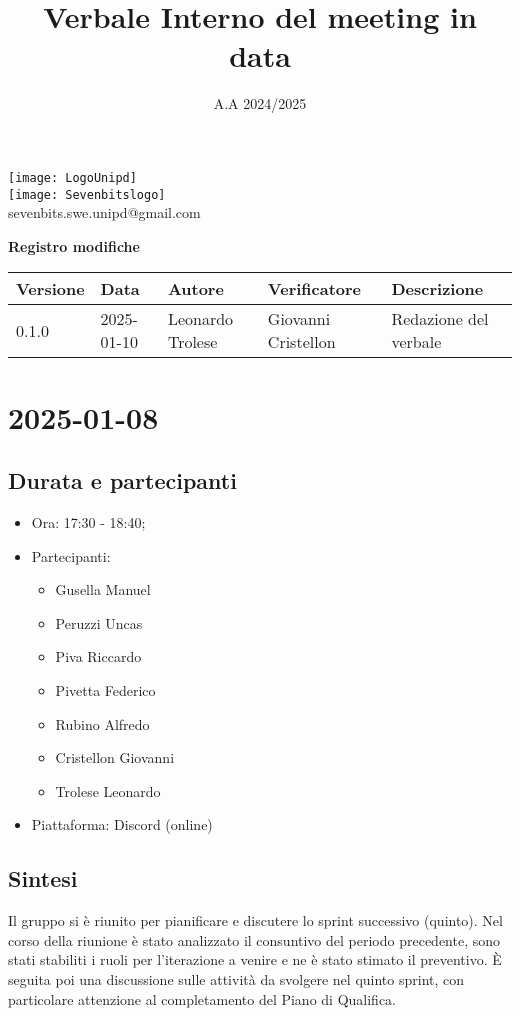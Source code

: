 \documentclass[10pt]{article}
\title{Verbale Interno del meeting in data}
\date{A.A 2024/2025}
\begin{document}
\maketitle
\begin{center}
\texttt{[image: LogoUnipd]}\\
\texttt{[image: Sevenbitslogo]}\\
sevenbits.swe.unipd@gmail.com\\
\vspace{2mm}

\textbf{Registro modifiche}\\
\vspace{2mm}
\begin{tabularx}{\textwidth}{|l|l|l|l|X|}
\hline
\textbf{Versione} & \textbf{Data} & \textbf{Autore} & \textbf{Verificatore} & \textbf{Descrizione} \\
\hline
0.1.0 & 2025-01-10 & Leonardo Trolese & Giovanni Cristellon & Redazione del verbale \\
\hline
\end{tabularx}
\end{center}

\newpage
\tableofcontents
\newpage
\section{2025-01-08}
\subsection{Durata e partecipanti}
\begin{itemize}
\item Ora: 17:30 - 18:40;
\item Partecipanti: 	
	\begin{itemize}
		\item Gusella Manuel
		\item Peruzzi Uncas
		\item Piva Riccardo
		\item Pivetta Federico
		\item Rubino Alfredo
		\item Cristellon Giovanni
		\item Trolese Leonardo
	\end{itemize}
\item Piattaforma: Discord (online)
\end{itemize}

\subsection{Sintesi}
Il gruppo si è riunito per pianificare e discutere lo sprint successivo (quinto). Nel corso della riunione è stato analizzato il consuntivo
del periodo precedente, sono stati stabiliti i ruoli per l'iterazione a venire e ne è stato stimato il preventivo. È seguita poi una discussione
sulle attività da svolgere nel quinto sprint, con particolare attenzione al completamento del Piano di Qualifica.
\end{document}
